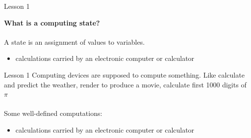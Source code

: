 \documentclass[aspectratio=1610]{beamer}
\begin{document}
\begin{frame}{Lesson 1}{}

{\Large\textbf{{What is a computing state?}}}\\~\\

\Large
A state is an assignment of values to variables.

\begin{itemize}
    \item calculations carried by an electronic computer or calculator
\end{itemize}

\end{frame}





\begin{frame}{Lesson 1}{}
\Large
Computing devices are supposed to compute something. Like calculate
and predict the weather, render to produce a movie, calculate first 1000 digits of $\pi$ \\~\\ 
Some well-defined computations:

\begin{itemize}
    \item calculations carried by an electronic computer or calculator
\end{itemize}

\end{frame}
\end{document}
